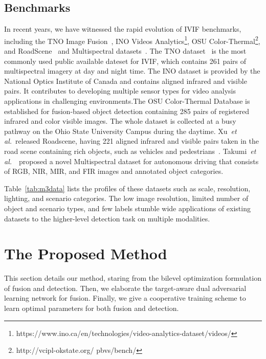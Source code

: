 \documentclass[10pt,twocolumn,letterpaper]{article}
\begin{document}
\subsection{Benchmarks}
In recent years, we have witnessed the rapid evolution of IVIF benchmarks, including the TNO Image Fusion~\cite{TNO}, INO Videos Analytics\footnote{https://www.ino.ca/en/technologies/video-analytics-dataset/videos/}, OSU Color-Thermal\footnote{http://vcipl-okstate.org/
	pbvs/bench/}, and RoadScene~\cite{U2Fusion2020} and Multispectral datasets~\cite{takumi2017multispectral}. The TNO dataset~\cite{TNO} is the most commonly used public available dateset for IVIF, which contains 261 pairs of multispectral imagery at day and night time. The INO dataset is provided by the National Optics Institute of Canada and contains aligned infrared and visible pairs. It contributes to developing multiple sensor types for video analysis applications in challenging environments.The OSU Color-Thermal Database is established for fusion-based object detection containing 285 pairs of registered infrared and color visible images. The whole dataset is collected at a busy pathway on the Ohio State University Campus during the daytime. Xu~\emph{et al.}~released Roadscene, having 221 aligned infrared and visible pairs taken in the road scene containing rich objects, such as vehicles and pedestrians~\cite{U2Fusion2020}. Takumi~\emph{et al.}~\cite{takumi2017multispectral}~proposed a novel Multispectral dataset for autonomous driving that consists of RGB, NIR, MIR, and FIR images and annotated object categories. 

Table~\ref{tab:m3data} lists the profiles of these datasets such as scale, resolution, lighting, and scenario categories. The low image resolution, limited number of object and scenario types, and few labels stumble wide applications of existing datasets to the higher-level detection task on multiple modalities.



\section{The Proposed Method}
This section details our method, staring from the bilevel optimization formulation of fusion and detection. Then, we elaborate the target-aware dual adversarial learning network for fusion. Finally, we give a cooperative training scheme to learn optimal parameters for both fusion and detection.
\end{document}
